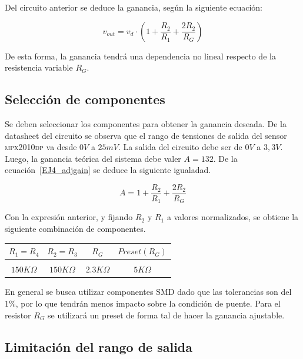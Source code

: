 Del circuito anterior se deduce la ganancia, seg\'un la siguiente ecuaci\'on:

\begin{equation}
v_{out} = v_d \cdot \left( 1+\frac{R_2}{R_1}+\frac{2R_2}{R_G} \right)
\label{EJ4_adjgain}
\end{equation}

De esta forma, la ganancia tendr\'a una dependencia no lineal respecto de la resistencia variable $R_G$.

\subsection{Selecci\'on de componentes}

Se deben seleccionar los componentes para obtener la ganancia deseada. De la datasheet del circuito se observa que el rango de tensiones de salida del sensor \textsc{mpx2010dp} va desde $0V$ a $25mV$. La salida del circuito debe ser de $0V$ a $3,3V$. Luego, la ganancia te\'orica del sistema debe valer $A = 132$. De la ecuaci\'on~\ref{EJ4_adjgain} se deduce la siguiente igualadad.


\begin{equation}
A = 1+\frac{R_2}{R_1}+\frac{2R_2}{R_G}
\end{equation}

Con la expresi\'on anterior, y fijando $R_2$ y $R_1$ a valores normalizados, se obtiene la siguiente combinaci\'on de componentes.

\begin{table}[H]
    \centering
    \begin{tabular}{c c c c}
        $R_1 = R_4$ & $R_2 = R_3$ & $R_G$ & $Preset (R_G)$  \\
        \hline \\
        $150 K\Omega$ & $150 K\Omega$ & $2.3 K\Omega$ & $5 K\Omega$ \\
        \hline
    \end{tabular}
\end{table}

En general se busca utilizar componentes SMD dado que las tolerancias son del $1\%$, por lo que tendr\'an menos impacto sobre la condici\'on de puente. Para el resistor $R_G$ se utilizar\'a un preset de forma tal de hacer la ganancia ajustable.

\subsection{Limitaci\'on del rango de salida}

